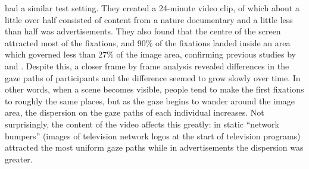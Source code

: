\documentclass[output=paper]{langsci/langscibook}
\begin{document}
\citet{brasel2008} had a similar test setting. They created a 24-minute video clip, of which about a little over half consisted of content from a nature documentary and a little less than half was advertisements. They also found that the centre of the screen attracted most of the fixations, and 90\% of the fixations landed inside an area which governed less than 27\% of the image area, confirming previous studies by \citet{tosi1997} and \citet{goldstein2007}. Despite this, a closer frame by frame analysis revealed differences in the gaze paths of participants and the difference seemed to grow slowly over time. In other words, when a scene becomes visible, people tend to make the first fixations to roughly the same places, but as the gaze begins to wander around the image area, the dispersion on the gaze paths of each individual increases. Not surprisingly, the content of the video affects this greatly: in \citet{brasel2008} static ``network bumpers'' (images of television network logos at the start of television programs) attracted the most uniform gaze paths while in advertisements the dispersion was greater. 
\end{document}
